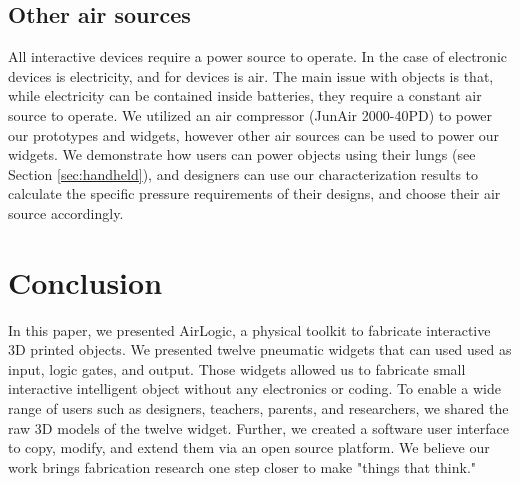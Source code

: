       \subsection{Other air sources}
        All interactive devices require a power source to operate. In the
        case of electronic devices is electricity, and for \al devices is
        air. The main issue with \al objects is that, while electricity can
        be contained inside batteries, they require a constant air source
        to operate. We utilized an air compressor (JunAir 2000-40PD) to
        power our prototypes and widgets, however other air sources can be
        used to power our widgets. We demonstrate how users can power \al
        objects using their lungs (see Section \ref{sec:handheld}), and designers
        can use our characterization results to calculate the specific
        pressure requirements of their designs, and choose their air source
        accordingly.
        
  \section{Conclusion}
    In this paper, we presented AirLogic, a physical toolkit to fabricate
    interactive 3D printed objects. We presented twelve pneumatic widgets that
    can used used as input, logic gates, and output. Those widgets allowed us
    to fabricate small interactive intelligent object without any electronics
    or coding. To enable a wide range of users such as designers, teachers,
    parents, and researchers, we shared the raw 3D models of the twelve
    widget. Further, we created a software user interface to copy, modify, and
    extend them via an open source platform. We believe our work brings
    fabrication research one step closer to make "things that think."